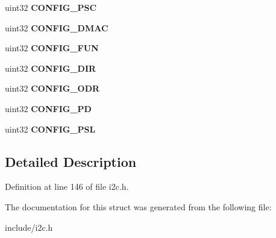\begin{DoxyCompactItemize}
uint32 {\bfseries C\+O\+N\+F\+I\+G\+\_\+\+P\+SC}
\item 
\mbox{\label{structi2c__config__reg_a1a8f72d67f7e6e00e505c2ff9af2996b}} 
uint32 {\bfseries C\+O\+N\+F\+I\+G\+\_\+\+D\+M\+AC}
\item 
\mbox{\label{structi2c__config__reg_a3db6219454dc6c4110f9d8be28e56c77}} 
uint32 {\bfseries C\+O\+N\+F\+I\+G\+\_\+\+F\+UN}
\item 
\mbox{\label{structi2c__config__reg_a94860f3fcc0316231dd78cb0e6f05413}} 
uint32 {\bfseries C\+O\+N\+F\+I\+G\+\_\+\+D\+IR}
\item 
\mbox{\label{structi2c__config__reg_a71d8ff51275efd8ee11bd5c7bf186abb}} 
uint32 {\bfseries C\+O\+N\+F\+I\+G\+\_\+\+O\+DR}
\item 
\mbox{\label{structi2c__config__reg_a92e2e96fcc550600ce7bfcc720ca25dd}} 
uint32 {\bfseries C\+O\+N\+F\+I\+G\+\_\+\+PD}
\item 
\mbox{\label{structi2c__config__reg_a0ee7817995aa413fc04877e96d7744ea}} 
uint32 {\bfseries C\+O\+N\+F\+I\+G\+\_\+\+P\+SL}
\end{DoxyCompactItemize}


\subsection{Detailed Description}


Definition at line 146 of file i2c.\+h.



The documentation for this struct was generated from the following file\+:\begin{DoxyCompactItemize}
\item 
include/i2c.\+h\end{DoxyCompactItemize}
